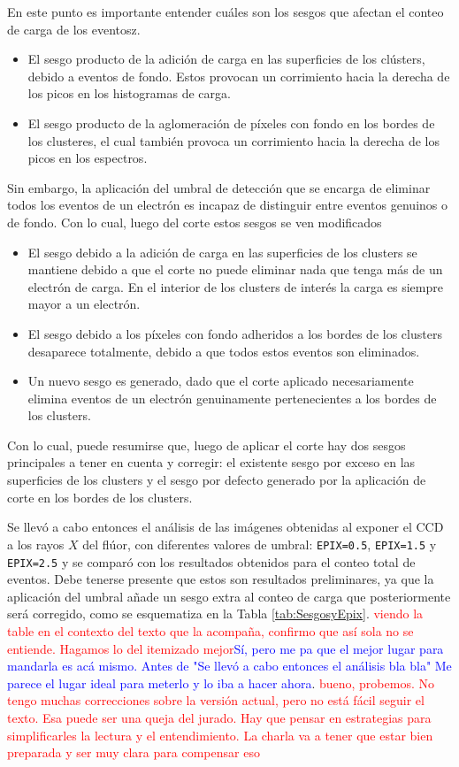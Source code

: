 En este punto es importante entender cuáles son los sesgos que afectan el conteo de carga de los eventosz. 
\begin{itemize}
    \item El sesgo producto de la adición de carga en las superficies de los clústers, debido a eventos de fondo. Estos provocan un corrimiento hacia la derecha de los picos en los histogramas de carga.
    \item El sesgo producto de la aglomeración de píxeles con fondo en los bordes de los clusteres, el cual también provoca un corrimiento hacia la derecha de los picos en los espectros.
\end{itemize}
Sin embargo, la aplicación del umbral de detección que se encarga de eliminar todos los eventos de un electrón es incapaz de distinguir entre eventos genuinos o de fondo. Con lo cual, luego del corte estos sesgos se ven modificados
\begin{itemize}
    \item El sesgo debido a la adición de carga en las superficies de los clusters se mantiene debido a que el corte no puede eliminar nada que tenga más de un electrón de carga. En el interior de los clusters de interés la carga es siempre mayor a un electrón.
    \item El sesgo debido a los píxeles con fondo adheridos a los bordes de los clusters desaparece totalmente, debido a que todos estos eventos son eliminados.
    \item Un nuevo sesgo es generado, dado que el corte aplicado necesariamente elimina eventos de un electrón genuinamente pertenecientes a los bordes de los clusters.
\end{itemize}
Con lo cual, puede resumirse que, luego de aplicar el corte hay dos sesgos principales a tener en cuenta y corregir: el existente sesgo por exceso en las superficies de los clusters y el sesgo por defecto generado por la aplicación de corte en los bordes de los clusters.

Se llevó a cabo entonces el análisis de las imágenes obtenidas al exponer el CCD a los rayos $X$ del flúor, con diferentes valores de umbral: \verb|EPIX=0.5|, \verb|EPIX=1.5| y \verb|EPIX=2.5| y se comparó con los resultados obtenidos para el conteo total de eventos. 
Debe tenerse presente que estos son resultados preliminares, ya que la aplicación del umbral añade un sesgo extra al conteo de carga que posteriormente será corregido, como se esquematiza en la Tabla \ref{tab:SesgosyEpix}. \textcolor{red}{viendo la table en el contexto del texto que la acompaña, confirmo que así sola no se entiende. Hagamos lo del itemizado mejor}\textcolor{blue}{Sí, pero me pa que el mejor lugar para mandarla es acá mismo. Antes de "Se llevó a cabo entonces el análisis bla bla" Me parece el lugar ideal para meterlo y lo iba a hacer ahora}. 
\textcolor{red}{bueno, probemos. No tengo muchas correcciones sobre la versión actual, pero no está fácil seguir el texto. Esa puede ser una queja del jurado. Hay que pensar en estrategias para simplificarles la lectura y el entendimiento. La charla va a tener que estar bien preparada y ser muy clara para compensar eso}

